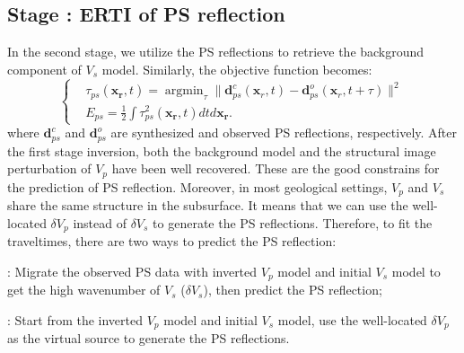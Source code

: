 \documentclass[extra,mreferee]{gji}
\newcommand{\Rome}[1]{{\bf\uppercase\expandafter{\romannumeral #1\relax}}}
\begin{document}
\subsection{Stage \Rome{2}: ERTI of PS reflection}
In the second stage, we utilize the PS reflections to retrieve the background component of
$V_s$ model. Similarly, the objective function becomes:
\begin{equation}
	\left\{
		\begin{aligned}
			&\tau_{ps}(\mathbf{x_r},t)=\mathop{\arg\min}_{\tau}
			\parallel\mathbf{d}^{c}_{ps}(\mathbf{x}_r,t)-\mathbf{d}^{o}_{ps}(\mathbf{x}_r,t+\tau)\parallel^2\\
			&E_{ps}=\frac{1}{2}\int\tau^2_{ps}(\mathbf{x_r},t)dtd\mathbf{x_r}.
		\end{aligned}
	\right.
    \label{eq:ObjectivefunctionPP} 
\end{equation}
where $\mathbf{d}^{c}_{ps}$ and $\mathbf{d}^{o}_{ps}$ are synthesized and observed PS reflections, respectively.
After the first stage inversion, both the background model and the structural image 
perturbation of $V_p$ have been well recovered. These are the good constrains for the prediction 
of PS reflection. Moreover, in
most geological settings, $V_p$ and $V_s$ share the same structure in the subsurface. 
It means that we can use the well-located $\delta V_p$ instead of $\delta V_s$ to generate the PS reflections. 
Therefore, to fit the traveltimes, there are two ways to predict the PS reflection:

\Rome{1}: Migrate the observed PS data with inverted $V_p$ model and
initial $V_s$ model to get the high wavenumber of $V_s$ ($\delta V_s$), then predict the PS reflection;

\Rome{2}: Start from the inverted $V_p$ model and initial $V_s$
model, use the well-located $\delta V_p$ as the virtual source to generate the PS reflections. 

\end{document}
